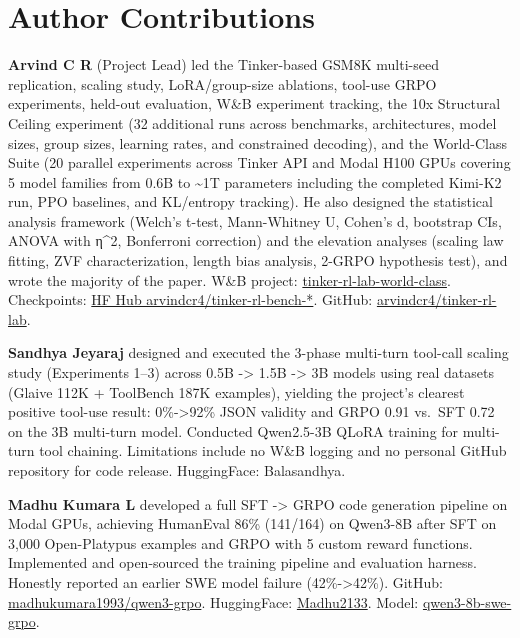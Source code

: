 \documentclass[
  american,
  11pt,
  a4paper,
  oneside]{report}
\begin{document}
\chapter{Author Contributions}\label{author-contributions}

\textbf{Arvind C R} (Project Lead) led the Tinker-based GSM8K multi-seed
replication, scaling study, LoRA/group-size ablations, tool-use GRPO
experiments, held-out evaluation, W\&B experiment tracking, the 10x
Structural Ceiling experiment (32 additional runs across benchmarks,
architectures, model sizes, group sizes, learning rates, and constrained
decoding), and the World-Class Suite (20 parallel experiments across
Tinker API and Modal H100 GPUs covering 5 model families from 0.6B to
\textasciitilde1T parameters including the completed Kimi-K2 run, PPO
baselines, and KL/entropy tracking). He also designed the statistical
analysis framework (Welch's t-test, Mann-Whitney U, Cohen's d, bootstrap
CIs, ANOVA with η\^{}2, Bonferroni correction) and the elevation
analyses (scaling law fitting, ZVF characterization, length bias
analysis, 2-GRPO hypothesis test), and wrote the majority of the paper.
W\&B project:
\href{https://wandb.ai/arvindcr4-pes-university/tinker-rl-lab-world-class}{tinker-rl-lab-world-class}.
Checkpoints: \href{https://huggingface.co/arvindcr4}{HF Hub
arvindcr4/tinker-rl-bench-*}. GitHub:
\href{https://github.com/arvindcr4/tinker-rl-lab}{arvindcr4/tinker-rl-lab}.

\textbf{Sandhya Jeyaraj} designed and executed the 3-phase multi-turn
tool-call scaling study (Experiments 1--3) across 0.5B -\textgreater{}
1.5B -\textgreater{} 3B models using real datasets (Glaive 112K +
ToolBench 187K examples), yielding the project's clearest positive
tool-use result: 0\%-\textgreater92\% JSON validity and GRPO 0.91
vs.~SFT 0.72 on the 3B multi-turn model. Conducted Qwen2.5-3B QLoRA
training for multi-turn tool chaining. Limitations include no W\&B
logging and no personal GitHub repository for code release. HuggingFace:
Balasandhya.

\textbf{Madhu Kumara L} developed a full SFT -\textgreater{} GRPO code
generation pipeline on Modal GPUs, achieving HumanEval 86\% (141/164) on
Qwen3-8B after SFT on 3,000 Open-Platypus examples and GRPO with 5
custom reward functions. Implemented and open-sourced the training
pipeline and evaluation harness. Honestly reported an earlier SWE model
failure (42\%-\textgreater42\%). GitHub:
\href{https://github.com/madhukumara1993/qwen3-grpo}{madhukumara1993/qwen3-grpo}.
HuggingFace: \href{https://huggingface.co/Madhu2133}{Madhu2133}. Model:
\href{https://huggingface.co/Madhu2133/qwen3-8b-swe-grpo}{qwen3-8b-swe-grpo}.
\end{document}

